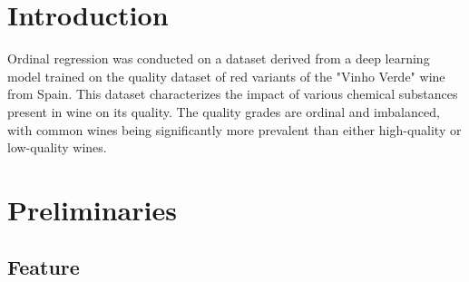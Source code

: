 \section{Introduction}
Ordinal regression was conducted on a dataset derived from a deep learning model trained on the quality dataset of red variants of the "Vinho Verde" wine from Spain. This dataset characterizes the impact of various chemical substances present in wine on its quality. The quality grades are ordinal and imbalanced, with common wines being significantly more prevalent than either high-quality or low-quality wines.

\section{Preliminaries} 
\subsection{Feature}\phantom{...}

